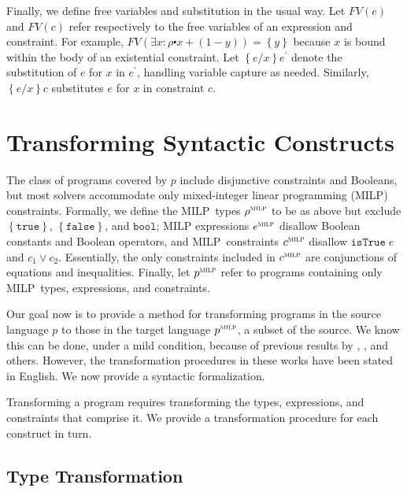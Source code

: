 \documentclass[preprint]{sigplanconf}%
\theoremstyle{remark}
\begin{document}
Finally, we define free variables and substitution in the usual way. Let
$FV(e)$ and $FV(c)$ refer respectively to the free variables of an expression
and constraint. For example, $FV(\exists x\!:\!\rho\centerdot
x+(1-y))=\left\{  y\right\}  $ because $x$ is bound within the body of an
existential constraint. Let $\left\{  e/x\right\}  e^{\prime}$ denote the
substitution of $e$ for $x$ in $e^{\prime}$, handling variable capture as
needed. Similarly, $\left\{  e/x\right\}  c$ substitutes $e$ for $x$ in
constraint $c$.

\section{Transforming Syntactic Constructs}

The class of programs covered by $p$ include disjunctive constraints and
Booleans, but most solvers accommodate only mixed-integer linear programming
(MILP) constraints. Formally, we define the MILP\ types $\rho^{\textsc{milp}}$
to be as above but exclude $\left\{  \mathtt{true}\right\}  $, $\left\{
\mathtt{false}\right\}  $, and $\mathtt{bool}$; MILP expressions
$e^{\textsc{milp}}$ disallow Boolean constants and Boolean operators, and
MILP\ constraints $c^{\textsc{milp}}$ disallow $\mathtt{isTrue}\;e$ and
$c_{1}\vee c_{2}$. Essentially, the only constraints included in
$c^{\textsc{milp}}$ are conjunctions of equations and inequalities. Finally,
let $p^{\textsc{milp}}$ refer to programs containing only MILP\ types,
expressions, and constraints.

Our goal now is to provide a method for transforming programs in the source
language $p$ to those in the target language $p^{\textsc{milp}}$, a subset of
the source. We know this can be done, under a mild condition, because of
previous results by \cite{Balas1974}, \cite{r3000}, and others. However, the
transformation procedures in these works have been stated in English. We now
provide a syntactic formalization.

Transforming a program requires transforming the types, expressions, and
constraints that comprise it. We provide a transformation procedure for each
construct in turn.

\subsection{Type Transformation}
\end{document}
